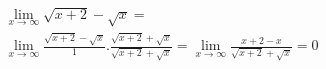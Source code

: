 \begin{ex}
\begin{align}
&\lim_{x\rightarrow \infty} \sqrt{x+2}-\sqrt{x}=\nonumber\\
&\lim_{x\rightarrow \infty} \frac{\sqrt{x+2}-\sqrt{x}}{1}.\frac{\sqrt{x+2}+\sqrt{x}}{\sqrt{x+2}+\sqrt{x}}=\lim_{x\rightarrow \infty} \frac{x+2-x}{\sqrt{x+2}+\sqrt{x}}=0\nonumber
\end{align}
\end{ex}
